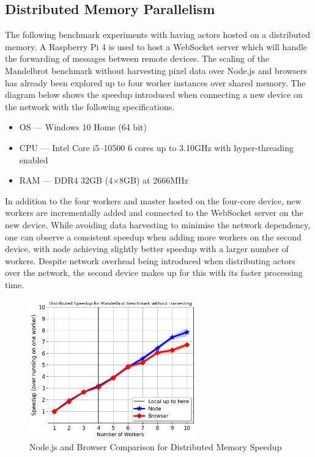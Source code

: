 \documentclass[oneside]{um-fict}
\begin{document}
\subsection{Distributed Memory Parallelism}
The following benchmark experiments with having actors hosted on a distributed memory. A Raspberry Pi 4 is used to host a WebSocket server which will handle the forwarding of messages between remote devices. The scaling of the Mandelbrot benchmark without harvesting pixel data over Node.js and browsers has already been explored up to four worker instances over shared memory. The diagram below shows the speedup introduced when connecting a new device on the network with the following specifications.
\begin{itemize}
    \item OS --- Windows 10 Home (64 bit)
    \item CPU --- Intel Core i5--10500 6 cores up to 3.10GHz with hyper-threading enabled
    \item RAM --- DDR4 32GB (4$\times$8GB) at 2666MHz
\end{itemize}
In addition to the four workers and master hosted on the four-core device, new workers are incrementally added and connected to the WebSocket server on the new device. While avoiding data harvesting to minimise the network dependency, one can observe a consistent speedup when adding more workers on the second device, with node achieving slightly better speedup with a larger number of workers. Despite network overhead being introduced when distributing actors over the network, the second device makes up for this with its faster processing time.
\begin{figure}[H]
    \begin{centering}
        \includegraphics[width=275px]{resources/distributed_memory_speedup.png}
        \caption{Node.js and Browser Comparison for Distributed Memory Speedup}
    \end{centering}
\end{figure}
\end{document}

